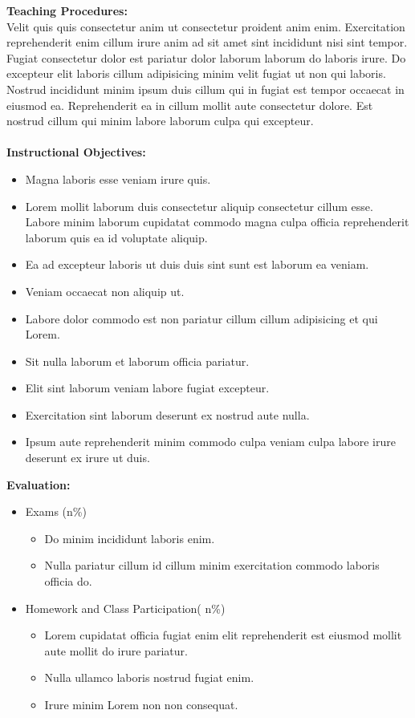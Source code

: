 \documentclass[11pt]{article}
\begin{document}
\textbf {\large Teaching Procedures:}\\
Velit quis quis consectetur anim ut consectetur proident anim enim. Exercitation reprehenderit enim cillum irure anim ad sit amet sint incididunt nisi sint tempor. Fugiat consectetur dolor est pariatur dolor laborum laborum do laboris irure. Do excepteur elit laboris cillum adipisicing minim velit fugiat ut non qui laboris. Nostrud incididunt minim ipsum duis cillum qui in fugiat est tempor occaecat in eiusmod ea. Reprehenderit ea in cillum mollit aute consectetur dolore. Est nostrud cillum qui minim labore laborum culpa qui excepteur.\\\\
\textbf {\large Instructional Objectives:}
\begin{itemize}
	\item Magna laboris esse veniam irure quis.  
  \item Lorem mollit laborum duis consectetur aliquip consectetur cillum esse. Labore minim laborum cupidatat commodo magna culpa officia reprehenderit laborum quis ea id voluptate aliquip. 
  \item Ea ad excepteur laboris ut duis duis sint sunt est laborum ea veniam.
  \item Veniam occaecat non aliquip ut.
  \item Labore dolor commodo est non pariatur cillum cillum adipisicing et qui Lorem.
  \item Sit nulla laborum et laborum officia pariatur.
  \item Elit sint laborum veniam labore fugiat excepteur.  
  \item Exercitation sint laborum deserunt ex nostrud aute nulla.
  \item Ipsum aute reprehenderit minim commodo culpa veniam culpa labore irure deserunt ex irure ut duis.
  
\end{itemize}
\textbf {\large Evaluation:} 
\begin{itemize}
    \item Exams (n\%)
    \begin{itemize}
        \item Do minim incididunt laboris enim.
        \item Nulla pariatur cillum id cillum minim exercitation commodo laboris officia do.
    \end{itemize}
    \item Homework and Class Participation( n\%)
    \begin{itemize}
        \item Lorem cupidatat officia fugiat enim elit reprehenderit est eiusmod mollit aute mollit do irure pariatur.
	\item Nulla ullamco laboris nostrud fugiat enim.
	\item Irure minim Lorem non non consequat.
    \end{itemize}
\end{itemize}
\newpage
\end{document}
